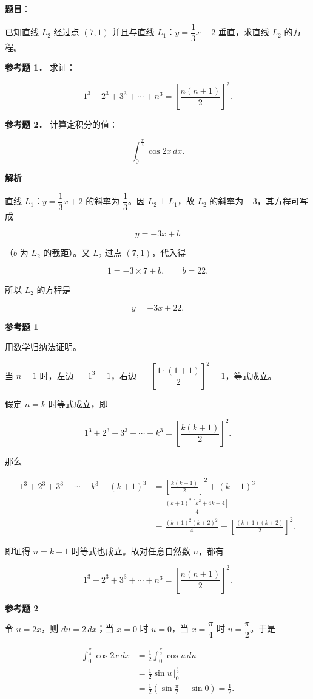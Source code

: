 \begin{answer}

\textbf{题目}：

已知直线 $L_2$ 经过点 $(7,1)$ 并且与直线 $L_1$：$y=\dfrac13x+2$ 垂直，求直线 $L_2$ 的方程。

\textbf{参考题 1．} 求证：

\nopagebreak[4]
\[
1^3+2^3+3^3+\cdots+n^3=\left[\frac{n(n+1)}{2}\right]^2.
\]

\textbf{参考题 2．} 计算定积分的值：

\nopagebreak[4]
\[
\int_0^{\frac{\pi}{4}}\cos2x\,dx.
\]

\textbf{解析}

直线 $L_1$：$y=\dfrac13x+2$ 的斜率为 $\dfrac13$。因 $L_2\perp L_1$，故 $L_2$ 的斜率为 $-3$，其方程可写成

\nopagebreak[4]
\[
y=-3x+b
\]

（$b$ 为 $L_2$ 的截距）。又 $L_2$ 过点 $(7,1)$，代入得

\nopagebreak[4]
\[
1=-3\times7+b,
\qquad
b=22.
\]

所以 $L_2$ 的方程是

\nopagebreak[4]
\[
y=-3x+22.
\]

\textbf{参考题 1}

用数学归纳法证明。

当 $n=1$ 时，左边 $=1^3=1$，右边 $=\left[\dfrac{1\cdot(1+1)}{2}\right]^2=1$，等式成立。

假定 $n=k$ 时等式成立，即

\nopagebreak[4]
\[
1^3+2^3+3^3+\cdots+k^3=\left[\frac{k(k+1)}{2}\right]^2.
\]

那么

\nopagebreak[4]
\[
\begin{aligned}
1^3+2^3+3^3+\cdots+k^3+(k+1)^3
&=\left[\frac{k(k+1)}{2}\right]^2+(k+1)^3\\
&=\frac{(k+1)^2\left[k^2+4k+4\right]}{4}\\
&=\frac{(k+1)^2(k+2)^2}{4}
=\left[\frac{(k+1)(k+2)}{2}\right]^2.
\end{aligned}
\]

即证得 $n=k+1$ 时等式也成立。故对任意自然数 $n$，都有

\nopagebreak[4]
\[
1^3+2^3+3^3+\cdots+n^3=\left[\frac{n(n+1)}{2}\right]^2.
\]

\textbf{参考题 2}

令 $u=2x$，则 $du=2\,dx$；当 $x=0$ 时 $u=0$，当 $x=\dfrac\pi4$ 时 $u=\dfrac\pi2$。于是

\nopagebreak[4]
\[
\begin{aligned}
\int_0^{\frac{\pi}{4}}\cos2x\,dx
&=\frac12\int_0^{\frac{\pi}{2}}\cos u\,du\\
&=\frac12\sin u\,\Bigg|_0^{\frac{\pi}{2}}\\
&=\frac12\left(\sin\frac{\pi}{2}-\sin0\right)=\frac12.
\end{aligned}
\]


\end{answer}
